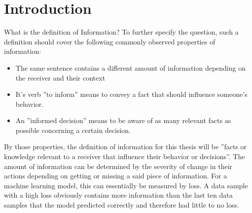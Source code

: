 \documentclass[draft,final]{vutinfth} %
\begin{document}
\frontmatter %

\addstatementpage

\begin{danksagung*}
\end{danksagung*}

\begin{acknowledgements*}
\end{acknowledgements*}

\begin{kurzfassung}
\end{kurzfassung}

\begin{abstract}
\end{abstract}


\tableofcontents %

\mainmatter

\chapter{Introduction}
What is the definition of Information? To further specify the question, such a definition should cover the following commonly observed properties of information:
\begin{itemize}
    \item The same sentence contains a different amount of information depending on the receiver and their context
    \item It's verb ''to inform'' means to convey a fact that should influence someone's behavior.
    \item An ''informed decision'' means to be aware of as many relevant facts as possible concerning a certain decision.
\end{itemize} 
By those properties, the definition of information for this thesis will be ''facts or knowledge relevant to a receiver that influence their behavior or decisions''. The amount of information can be determined by the severity of change in their actions depending on getting or missing a said piece of information. For a machine learning model, this can essentially be measured by loss. A data sample with a high loss obviously contains more information than the last ten data samples that the model predicted correctly and therefore had little to no loss. 
\end{document}
